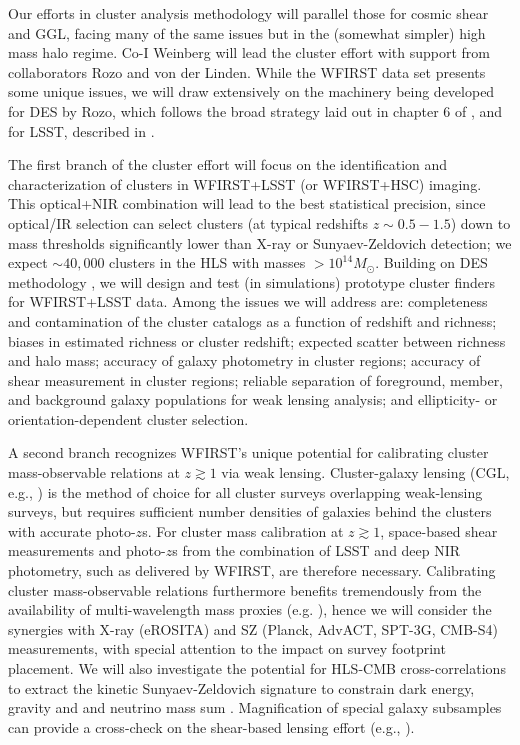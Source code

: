  Our efforts in cluster analysis methodology will parallel those for
cosmic shear and GGL, facing many of the same issues but in the
(somewhat simpler) high mass halo regime. Co-I Weinberg
will lead the cluster effort with support from collaborators Rozo and
von der Linden.  While the WFIRST data set presents some
unique issues, we will draw extensively on the machinery being developed for
DES by Rozo, which follows the broad strategy laid
out in chapter 6 of \cite{Weinberg2013}, and for LSST, described in \cite{LSSTDESC12}.

The first branch of the cluster effort will focus on the identification
and characterization of clusters in WFIRST+LSST (or WFIRST+HSC) imaging.
This optical+NIR combination will lead to the best statistical precision,
since optical/IR selection can select clusters (at typical redshifts
$z \sim 0.5-1.5$) down to mass thresholds significantly lower than
X-ray or Sunyaev-Zeldovich detection; we expect $\sim 40,000$ clusters in the HLS
with masses $>10^{14}M_\odot$.
Building on DES methodology
\cite{Rykoff2014}, we will design and test (in simulations) prototype cluster finders for
WFIRST+LSST data.
Among the issues we will address are: completeness and contamination
of the cluster catalogs as a function of redshift and richness; biases
in estimated richness or cluster redshift; expected scatter between
richness and halo mass; accuracy of galaxy photometry in cluster regions;
accuracy of shear measurement in cluster regions; reliable separation
of foreground, member, and background galaxy populations for weak
lensing analysis; and ellipticity- or orientation-dependent
cluster selection.

A second branch recognizes WFIRST's unique potential for calibrating
cluster mass-observable relations at $z\gtrsim1$ via weak lensing.
Cluster-galaxy lensing (CGL, e.g.,
\cite{Sheldon2009,VonDerLinden2014}) is the method of choice for all
cluster surveys overlapping weak-lensing surveys, but requires
sufficient number densities of galaxies behind the clusters with
accurate photo-$z$s.  For cluster mass calibration at $z\gtrsim1$,
space-based shear measurements and photo-$z$s from the combination of
LSST and deep NIR photometry, such as delivered by WFIRST, are
therefore necessary. Calibrating cluster mass-observable relations
furthermore benefits tremendously from the availability of
multi-wavelength mass proxies (e.g. \cite{Wu2010}), hence we will
consider the synergies with X-ray (eROSITA) and SZ (Planck, AdvACT,
SPT-3G, CMB-S4) measurements, with special attention to the impact on
survey footprint placement.  We will also investigate the potential for HLS-CMB cross-correlations to extract the kinetic Sunyaev-Zeldovich signature to constrain dark energy, gravity and and neutrino mass sum \cite{Mueller2014a,Mueller2014b}.  Magnification of special galaxy subsamples can provide a cross-check on
the shear-based lensing effort (e.g., \cite{Hildebrandt13}).

